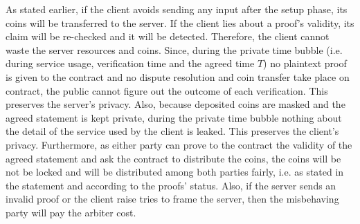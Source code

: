 As stated earlier, if the client avoids sending any input after the setup phase, its coins will be transferred to the server. If the client lies about a proof's validity, its claim will be re-checked and  it will be detected. Therefore, the client cannot waste the server resources and coins.  Since, during the private time bubble (i.e. during service usage, verification time and the agreed time $T$) no plaintext proof is given to the contract and no dispute resolution and coin transfer take place on contract, the public cannot figure out the outcome of each verification. This  preserves the server's privacy. Also, because deposited coins are masked and the agreed statement is kept private,  during the private time bubble nothing about the detail of the service used by the client   is leaked. This preserves the client's privacy. Furthermore, as either party can prove to the contract the validity of the agreed statement and ask the contract to distribute the coins, the coins will be not be locked and will be distributed among both parties fairly, i.e. as stated in the statement and according to the proofs' status. Also, if the server sends an invalid proof or the client raise tries to frame the server, then the misbehaving party will pay the arbiter cost. 

